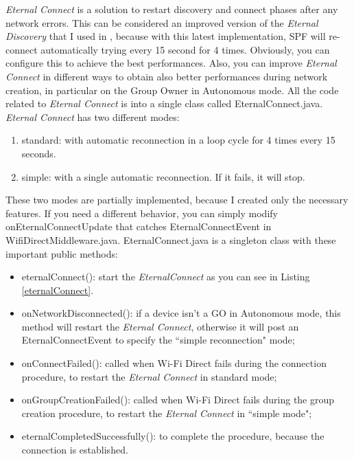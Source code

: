 \emph{Eternal Connect} is a solution to restart discovery and connect phases after any network errors. This can be considered an improved version of the 	\emph{Eternal Discovery} that I used in , because with this latest implementation, SPF will re-connect automatically trying every 15 second for 4 times. Obviously, you can configure this to achieve the best performances. Also, you can improve \emph{Eternal Connect} in different ways to obtain also better performances during network creation, in particular on the Group Owner in Autonomous mode. All the code related to \emph{Eternal Connect} is into a single class called \textsf{EternalConnect.java}.
\emph{Eternal Connect} has two different modes:
\begin{enumerate}
	\item standard: with automatic reconnection in a loop cycle for 4 times every 15 seconds.
	\item simple: with a single automatic reconnection. If it fails, it will stop.
\end{enumerate}
These two modes are partially implemented, because I created only the necessary features. If you need a different behavior, you can simply modify \textsf{onEternalConnectUpdate} that catches \textsf{EternalConnectEvent} in \textsf{WifiDirectMiddleware.java}. \textsf{EternalConnect.java} is a singleton class with these important public methods:
\begin{itemize}
	\item \textsf{eternalConnect()}: start the \emph{EternalConnect} as you can see in Listing 	\ref{eternalConnect}.
	\item \textsf{onNetworkDisconnected()}: if a device isn't a GO in Autonomous mode, this method will restart the \emph{Eternal Connect}, otherwise it will post an \textsf{EternalConnectEvent} to specify the ``simple reconnection" mode;
	\item \textsf{onConnectFailed()}: called when Wi-Fi Direct fails during the connection procedure, to restart the \emph{Eternal Connect} in standard mode;
	\item \textsf{onGroupCreationFailed()}: called when Wi-Fi Direct fails during the group creation procedure, to restart the \emph{Eternal Connect} in ``simple mode";
	\item \textsf{eternalCompletedSuccessfully()}: to complete the procedure, because the connection is established.
\end{itemize}


